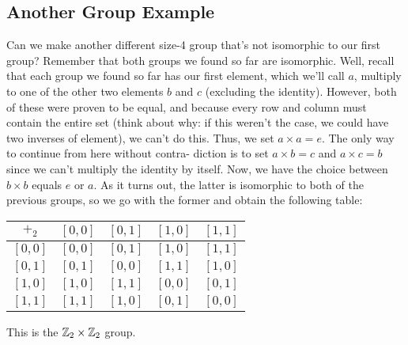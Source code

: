 \subsection{Another Group Example}
Can we make another different size-4 group that's not isomorphic to our
ﬁrst group? Remember that both groups we found so far are isomorphic.
Well, recall that each group we found so far has our ﬁrst element, which
we'll call $a$, multiply to one of the other two elements $b$ and $c$ (excluding
the identity). However, both of these were proven to be equal, and because
every row and column must contain the entire set (think about why: if this
weren't the case, we could have two inverses of element), we can't do this.
Thus, we set $a \times a = e$. The only way to continue from here without contra-
diction is to set $a \times b = c$ and $a \times c = b$ since we can't multiply the identity
by itself. Now, we have the choice between $b \times b$ equals $e$ or $a$. As it turns
out, the latter is isomorphic to both of the previous groups, so we go with
the former and obtain the following table:
\begin{center}
    \begin{tabular}{|c|c|c|c|c|}
        \hline 
        $+_2$ & $[0,0]$ & $[0,1]$ & $[1,0]$ & $[1,1]$ \\ \hline 
        $[0,0]$ & $[0,0]$ & $[0,1]$ & $[1,0]$ & $[1,1]$ \\ \hline 
        $[0,1]$ & $[0,1]$ & $[0,0]$ & $[1,1]$ & $[1,0]$ \\ \hline 
        $[1,0]$ & $[1,0]$ & $[1,1]$ & $[0,0]$ & $[0,1]$ \\ \hline 
        $[1,1]$ & $[1,1]$ & $[1,0]$ & $[0,1]$ & $[0,0]$ \\ \hline 
    \end{tabular}
\end{center}
This is the $\mathbb{Z}_2 \times \mathbb{Z}_2$ group.\\

